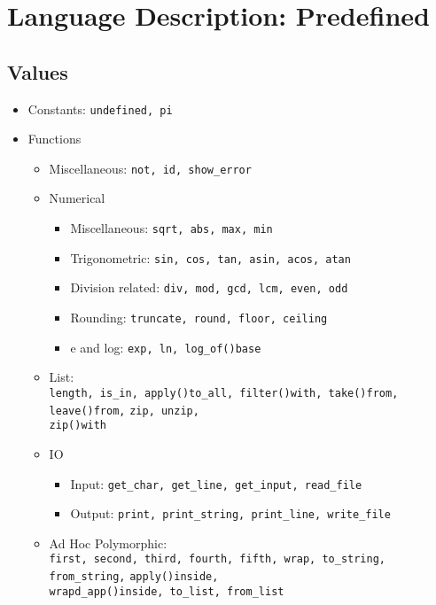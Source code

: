 \documentclass{article}
\begin{document}
\newpage

\section{Language Description: Predefined}

\subsection{Values}

\begin{itemize}

\item Constants: \verb|undefined, pi|

\item Functions
  \begin{itemize}

  \item Miscellaneous: \verb|not, id, show_error|

  \item Numerical
    \begin{itemize}
    \item Miscellaneous: \verb|sqrt, abs, max, min|
    \item Trigonometric: \verb|sin, cos, tan, asin, acos, atan|
    \item Division related: \verb|div, mod, gcd, lcm, even, odd|
    \item Rounding: \verb|truncate, round, floor, ceiling|
    \item e and log: \verb|exp, ln, log_of()base|
    \end{itemize}

  \item List:\\
    \verb|length, is_in, apply()to_all, filter()with, take()from, leave()from,|
    \verb|zip, unzip,|
    \\
    \verb|zip()with|

  \item IO
    \begin{itemize}
    \item Input: \verb|get_char, get_line, get_input, read_file|
    \item Output: \verb|print, print_string, print_line, write_file|
    \end{itemize}

  \item Ad Hoc Polymorphic:\\
  \verb|first, second, third, fourth, fifth, wrap, to_string, from_string,|
  \verb|apply()inside, |
  \\
  \verb|wrapd_app()inside, to_list, from_list|

  \end{itemize}
\end{itemize}
\end{document}
